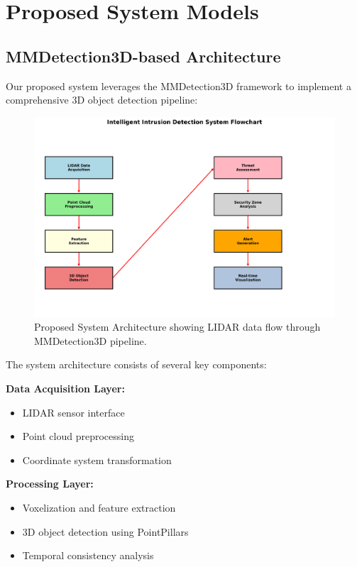 \documentclass[conference]{IEEEtran}
\begin{document}
\section{Proposed System Models}
\subsection{MMDetection3D-based Architecture}
Our proposed system leverages the MMDetection3D framework to implement a comprehensive 3D object detection pipeline:

\begin{figure}[htbp]
\centering
\includegraphics[width=\columnwidth]{system_flowchart.png}
\caption{Proposed System Architecture showing LIDAR data flow through MMDetection3D pipeline.}
\label{fig:system_arch}
\end{figure}

The system architecture consists of several key components:

\textbf{Data Acquisition Layer:}
\begin{itemize}
\item LIDAR sensor interface
\item Point cloud preprocessing
\item Coordinate system transformation
\end{itemize}

\textbf{Processing Layer:}
\begin{itemize}
\item Voxelization and feature extraction
\item 3D object detection using PointPillars
\item Temporal consistency analysis
\end{itemize}
\end{document}
